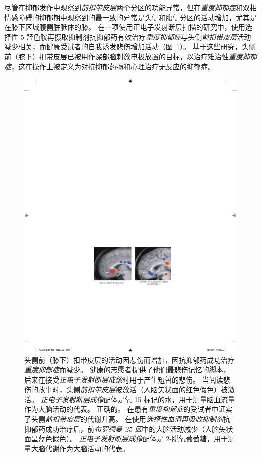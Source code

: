 尽管在抑郁发作中观察到\textit{前扣带皮层}两个分区的功能异常，但在\textit{重度抑郁症}和双相情感障碍的抑郁期中观察到的最一致的异常是头侧和腹侧分区的活动增加，尤其是在膝下区域腹侧胼胝体的膝。
在一项使用正电子发射断层扫描的研究中，使用选择性 5-羟色胺再摄取抑制剂抗抑郁药有效治疗\textit{重度抑郁症}与头侧\textit{前扣带皮层}活动减少相关，而健康受试者的自我诱发悲伤增加活动（图~\ref{fig:61_4}）。
基于这些研究，头侧前（膝下）扣带皮层已被用作深部脑刺激电极放置的目标，以治疗难治性\textit{重度抑郁症}，这在操作上被定义为对抗抑郁药物和心理治疗无反应的抑郁症。


\begin{figure}[htbp]
	\centering
	\includegraphics[width=0.7\linewidth]{chap61/fig_61_4}
	\caption{头侧前（膝下）扣带皮层的活动因悲伤而增加，因抗抑郁药成功治疗\textit{重度抑郁症}而减少\cite{mayberg1997cingulate}。
		 健康的志愿者提供了他们最悲伤记忆的脚本，后来在接受\textit{正电子发射断层成像}时用于产生短暂的悲伤。
		 当阅读悲伤的故事时，头侧\textit{前扣带皮层}被激活（人脑矢状面的红色假色）被激活。
		 \textit{正电子发射断层成像}配体是氧 15 标记的水，用于测量脑血流量作为大脑活动的代表。 正确的。
		 在患有\textit{重度抑郁症}的受试者中证实了头侧\textit{前扣带皮层}的代谢升高。
		 在使用\textit{选择性血清再吸收抑制剂}抗抑郁药成功治疗后，前\textit{布罗德曼 25 区}中的大脑活动减少（人脑矢状面呈蓝色假色）。
		 \textit{正电子发射断层成像}配体是 2-脱氧葡萄糖，用于测量大脑代谢作为大脑活动的代表。}
	\label{fig:61_4}
\end{figure}


